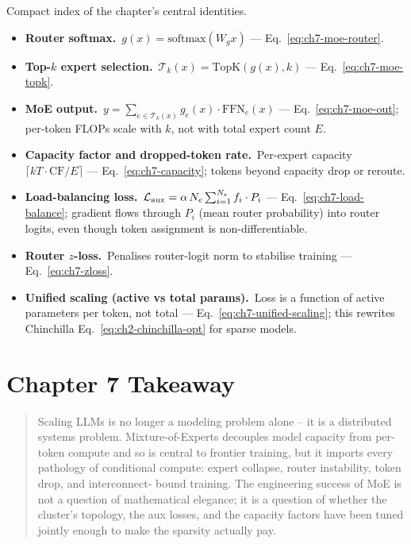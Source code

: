 \begin{derivledger}
Compact index of the chapter's central identities.
\begin{itemize}
  \item \textbf{Router softmax.}\
        $g(x) = \mathrm{softmax}(W_g x)$
        --- Eq.~\eqref{eq:ch7-moe-router}.
  \item \textbf{Top-$k$ expert selection.}\
        $\mathcal{T}_k(x) = \mathrm{TopK}(g(x), k)$
        --- Eq.~\eqref{eq:ch7-moe-topk}.
  \item \textbf{MoE output.}\
        $y = \sum_{e \in \mathcal{T}_k(x)} g_e(x) \cdot \mathrm{FFN}_e(x)$
        --- Eq.~\eqref{eq:ch7-moe-out}; per-token FLOPs scale with $k$,
        not with total expert count $E$.
  \item \textbf{Capacity factor and dropped-token rate.}\
        Per-expert capacity $\lceil k T \cdot \mathrm{CF} / E \rceil$
        --- Eq.~\eqref{eq:ch7-capacity}; tokens beyond capacity
        drop or reroute.
  \item \textbf{Load-balancing loss.}\
        $\mathcal{L}_{\rm aux} = \alpha\,N_e \sum_{i=1}^{N_e} f_i \cdot P_i$
        --- Eq.~\eqref{eq:ch7-load-balance}; gradient flows
        through $P_i$ (mean router probability) into router logits,
        even though token assignment is non-differentiable.
  \item \textbf{Router $z$-loss.}\
        Penalises router-logit norm to stabilise training
        --- Eq.~\eqref{eq:ch7-zloss}.
  \item \textbf{Unified scaling (active vs total params).}\
        Loss is a function of active parameters per token, not total
        --- Eq.~\eqref{eq:ch7-unified-scaling}; this rewrites
        Chinchilla Eq.~\eqref{eq:ch2-chinchilla-opt} for sparse
        models.
\end{itemize}
\end{derivledger}

\section{Chapter 7 Takeaway}

\begin{quote}
Scaling LLMs is no longer a modeling problem alone -- it is a
distributed systems problem. Mixture-of-Experts decouples model
capacity from per-token compute and so is central to frontier
training, but it imports every pathology of conditional compute:
expert collapse, router instability, token drop, and interconnect-
bound training. The engineering success of MoE is not a question of
mathematical elegance; it is a question of whether the cluster's
topology, the aux losses, and the capacity factors have been tuned
jointly enough to make the sparsity actually pay.
\end{quote}
